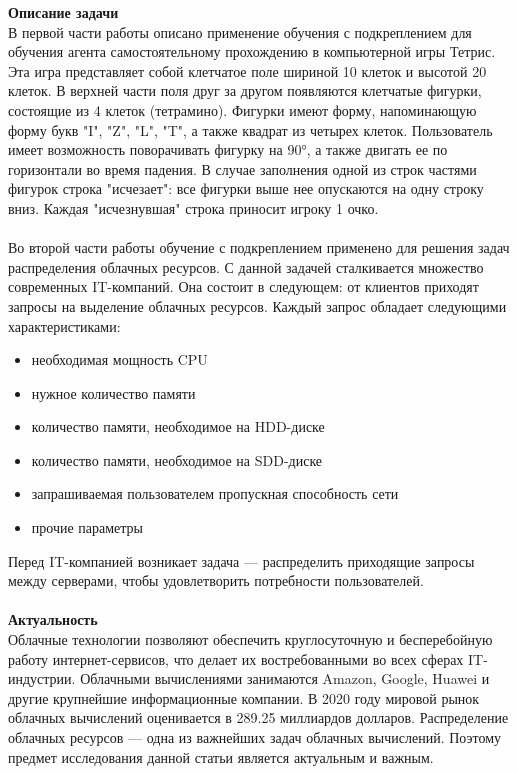 \documentclass[draft]{article}
\begin{document}
\textbf{Описание задачи}\\
В первой части работы описано применение обучения с подкреплением для обучения агента самостоятельному прохождению в компьютерной игры Тетрис\cite{litlink1}. Эта игра представляет собой клетчатое поле шириной 10 клеток и высотой 20 клеток. В верхней части поля друг за другом появляются клетчатые фигурки, состоящие из 4 клеток (тетрамино). Фигурки имеют форму, напоминающую форму букв "I", "Z", "L", "T", а также квадрат из четырех клеток. Пользователь имеет возможность поворачивать фигурку на 90°, а также двигать ее по горизонтали во время падения. В случае заполнения одной из строк частями фигурок строка "исчезает": все фигурки выше нее опускаются на одну строку вниз. Каждая "исчезнувшая" строка приносит игроку 1 очко.\\
~\\
Во второй части работы обучение с подкреплением применено для решения задач распределения облачных ресурсов. С данной задачей сталкивается множество современных IT-компаний. Она состоит в следующем: от клиентов приходят запросы на выделение облачных ресурсов. Каждый запрос обладает следующими характеристиками:\\
\begin{itemize}
\item необходимая мощность CPU
\item нужное количество памяти
\item количество памяти, необходимое на HDD-диске
\item количество памяти, необходимое на SDD-диске
\item запрашиваемая пользователем пропускная способность сети
\item прочие параметры
\end{itemize}
Перед IT-компанией возникает задача — распределить приходящие запросы между серверами, чтобы удовлетворить потребности пользователей.\\
~\\
\textbf{Актуальность}\\
Облачные технологии позволяют обеспечить круглосуточную и бесперебойную работу интернет-сервисов, что делает их востребованными во всех сферах IT-индустрии. Облачными вычислениями занимаются Amazon, Google, Huawei и другие крупнейшие информационные компании\cite{litlink2}\cite{litlink3}. В 2020 году мировой рынок облачных вычислений оценивается в 289.25 миллиардов долларов\cite{litlink4}. Распределение облачных ресурсов — одна из важнейших задач облачных вычислений. Поэтому предмет исследования данной статьи является актуальным и важным.\\
\end{document}
